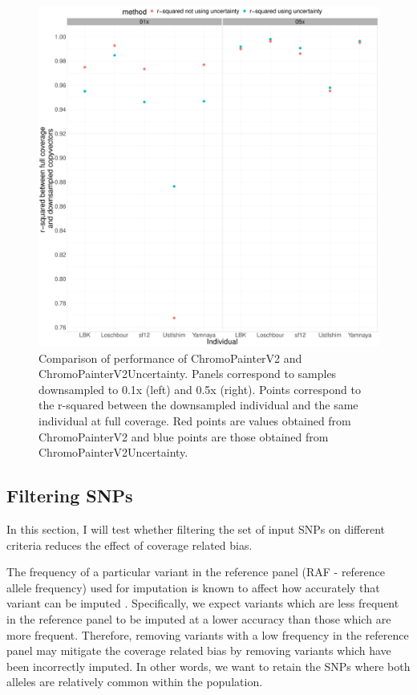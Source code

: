 \begin{figure}[htp]
    \centering
    \includegraphics[width=1.0\textwidth]{../images/chapter1/uncertainty_v_noUncertainty_0.5x_0.1x.pdf}
    \caption{Comparison of performance of ChromoPainterV2 and ChromoPainterV2Uncertainty. Panels correspond to samples downsampled to 0.1x (left) and 0.5x (right). Points correspond to the r-squared between the downsampled individual and the same individual at full coverage. Red points are values obtained from ChromoPainterV2 and blue points are those obtained from ChromoPainterV2Uncertainty.}
    \label{fig:uncertainty_v_noUncertainty_0.5x_0.1x}
\end{figure}


\subsection{Filtering SNPs}

In this section, I will test whether filtering the set of input SNPs on different criteria reduces the effect of coverage related bias. 

The frequency of a particular variant in the reference panel (RAF - reference allele frequency) used for imputation is known to affect how accurately that variant can be imputed \cite{rubinacci2021efficient, delaneau2018integrative, Browning2016, hui2020evaluating}. Specifically, we expect variants which are less frequent in the reference panel to be imputed at a lower accuracy than those which are more frequent. Therefore, removing variants with a low frequency in the reference panel may mitigate the coverage related bias by removing variants which have been incorrectly imputed. In other words, we want to retain the SNPs where both alleles are relatively common within the population. 

